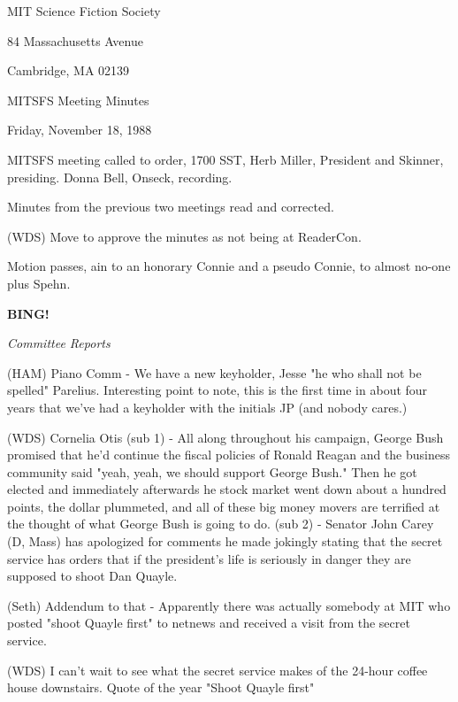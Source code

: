 \documentclass[12pt]{article}
\newcommand{\bing}{{\bf BING!} }
\newcommand{\goto}[1]{\bing \vskip 12pt \centerline{{\em{#1}}}}
\begin{document}
\begin{center}

MIT Science Fiction Society 

84 Massachusetts Avenue

Cambridge, MA 02139

\vspace{12pt}

MITSFS Meeting Minutes 

Friday, November 18, 1988

\end{center}
 
\vspace{18pt}

\setlength{\parskip}{6pt}

\noindent
MITSFS meeting called to order, 1700 SST, Herb Miller, President and Skinner, presiding. Donna Bell, Onseck, recording.

Minutes from the previous two meetings read and corrected.

(WDS) Move to approve the minutes as not being at ReaderCon.

Motion passes, ain to an honorary Connie and a pseudo Connie, to almost no-one plus Spehn.

\goto{Committee Reports}

(HAM) Piano Comm - We have a new keyholder, Jesse "he who shall not be spelled" Parelius. Interesting point to note, this is the first time in about four years that we've had a keyholder with the initials JP (and nobody cares.)

(WDS) Cornelia Otis (sub 1) - All along throughout his campaign, George Bush promised that he'd continue the fiscal policies of Ronald Reagan and the business community said "yeah, yeah, we should support George Bush." Then he got elected and immediately afterwards he stock market went down about a hundred points, the dollar plummeted, and all of these big money movers are terrified at the thought of what George Bush is going to do. (sub 2) - Senator John Carey (D, Mass) has apologized for comments he made jokingly stating that the secret service has orders that if the president's life is seriously in danger they are supposed to shoot Dan Quayle.

(Seth) Addendum to that - Apparently there was actually somebody at MIT who posted "shoot Quayle first" to netnews and received a visit from the secret service.

(WDS) I can't wait to see what the secret service makes of the 24-hour coffee house downstairs. Quote of the year "Shoot Quayle first"
\end{document}
